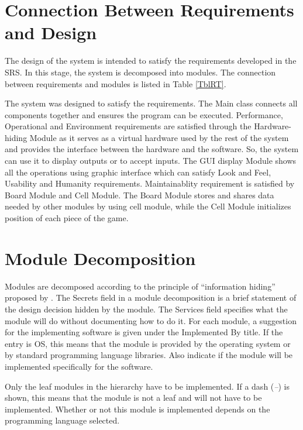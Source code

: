 \documentclass[12pt, titlepage]{article}
\begin{document}
\section{Connection Between Requirements and Design} \label{SecConnection}

The design of the system is intended to satisfy the requirements developed in
the SRS. In this stage, the system is decomposed into modules. The connection
between requirements and modules is listed in Table \ref{TblRT}.


The system was designed to satisfy the requirements. The Main class connects all components together and ensures the program can be executed. Performance, Operational and Environment requirements are satisfied through the Hardware-hiding Module as it serves as a virtual hardware used by the rest of the system and provides the interface between the hardware and the software. So, the system can use it to display outputs or to accept inputs. The GUI display Module shows all the operations using graphic interface which can satisfy Look and Feel, Usability and Humanity requirements. Maintainablity requirement is satisfied by Board Module and Cell Module. The Board Module stores and shares data needed by other modules by using cell module, while the Cell Module initializes position of each piece of the game. 


\section{Module Decomposition} \label{SecMD}

Modules are decomposed according to the principle of ``information hiding''
proposed by \citet{ParnasEtAl1984}. The Secrets field in a module
decomposition is a brief statement of the design decision hidden by the
module. The Services field specifies what the module will do
without documenting how to do it. For each module, a suggestion for the
implementing software is given under the Implemented By title. If the
entry is OS, this means that the module is provided by the operating
system or by standard programming language libraries.  Also indicate if the
module will be implemented specifically for the software.

Only the leaf modules in the hierarchy have to be implemented. If a dash (\emph{--}) is shown, this means that the module is not a leaf and will not have to be implemented. Whether or not this module is implemented depends on the programming language selected.\\
\end{document}
